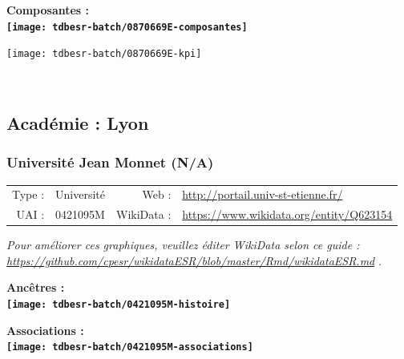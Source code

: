\documentclass[12pt,french,]{article}
\begin{document}
\hrulefill

\begin{center} \bf Composantes : \\  
\texttt{[image: tdbesr-batch/0870669E-composantes]} \end{center}

\begin{center}\texttt{[image: tdbesr-batch/0870669E-kpi]} \end{center}\checkoddpage

\ifoddpage \fi ~\newpage  

\hypertarget{acaduxe9mie-lyon}{%
\subsection{Académie : Lyon}\label{acaduxe9mie-lyon}}

\hypertarget{universituxe9-jean-monnet-na}{%
\subsubsection{Université Jean Monnet
(N/A)}\label{universituxe9-jean-monnet-na}}

\begin{tabular*}{\textwidth}{rp{5cm}rl}  
\hline  
Type : & Université & Web : &\href{http://portail.univ-st-etienne.fr/}{http://portail.univ-st-etienne.fr/} \\  
UAI : & 0421095M & WikiData : & \href{https://www.wikidata.org/entity/Q623154}{https://www.wikidata.org/entity/Q623154} \\  
\hline  
\end{tabular*}

\textit{\scriptsize Pour améliorer ces graphiques, veuillez éditer WikiData selon ce guide :  \href{https://github.com/cpesr/wikidataESR/blob/master/Rmd/wikidataESR.md}{https://github.com/cpesr/wikidataESR/blob/master/Rmd/wikidataESR.md}}
.

\vspace{1cm}  
\begin{minipage}[b]{0.50\textwidth}\begin{center} \bf Ancêtres : \\  
\texttt{[image: tdbesr-batch/0421095M-histoire]} \end{center}\end{minipage}\begin{minipage}[b]{0.50\textwidth}\begin{center} \bf Associations : \\  
\texttt{[image: tdbesr-batch/0421095M-associations]} \end{center}\end{minipage}
\end{document}
